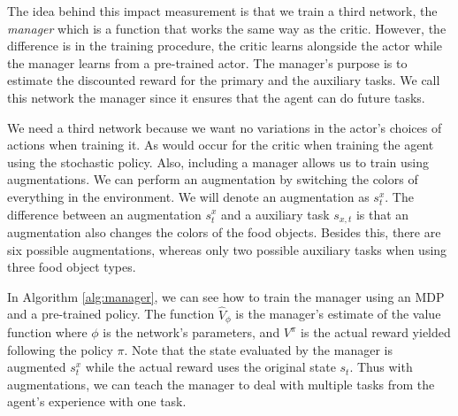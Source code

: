 \documentclass[12pt,A4]{report}
\theoremstyle{definition}
\begin{document}



The idea behind this impact measurement is that we train a third network, the \textit{manager} which is a function that works the same way as the critic. However, the difference is in the training procedure, the critic learns alongside the actor while the manager learns from a pre-trained actor. The manager's purpose is to estimate the discounted reward for the primary and the auxiliary tasks. We call this network the manager since it ensures that the agent can do future tasks.

We need a third network because we want no variations in the actor's choices of actions when training it. As would occur for the critic when training the agent using the stochastic policy. Also, including a manager allows us to train using augmentations. We can perform an augmentation by switching the colors of everything in the environment. We will denote an augmentation as $s^x_t$. The difference between an augmentation $s^x_t$ and a auxiliary task $s_{x,t}$ is that an augmentation also changes the colors of the food objects. Besides this, there are six possible augmentations, whereas only two possible auxiliary tasks when using three food object types. 

In Algorithm \ref{alg:manager}, we can see how to train the manager using an MDP and a pre-trained policy. The function $\hat{V}_\phi$ is the manager's estimate of the value function where $\phi$ is the network's parameters, and $V^\pi$ is the actual reward yielded following the policy $\pi$. Note that the state evaluated by the manager is augmented $s^x_t$ while the actual reward uses the original state $s_t$. Thus with augmentations, we can teach the manager to deal with multiple tasks from the agent's experience with one task.
\end{document}
